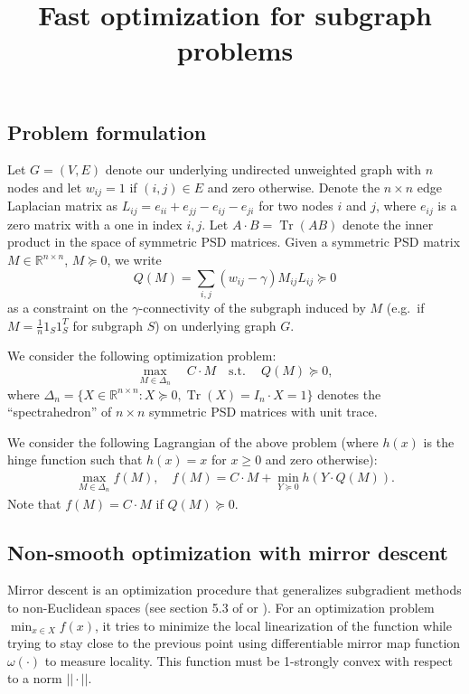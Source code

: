 \documentclass{article}
\DeclareMathOperator{\Tr}{Tr}
\begin{document}
\title{Fast optimization for subgraph problems}
\author{\vspace{-10pt}}

\maketitle

\subsection*{Problem formulation}

Let $G = (V,E)$ denote our underlying undirected unweighted graph with $n$ nodes and let $w_{ij} = 1$ if $(i,j) \in E$ and zero otherwise. Denote the $n \times n$ edge Laplacian matrix as $L_{ij} = e_{ii} + e_{jj} - e_{ij} - e_{ji}$ for two nodes $i$ and $j$, where $e_{ij}$ is a zero matrix with a one in index $i,j$. Let $A \cdot B = \Tr(A B)$ denote the inner product in the space of symmetric PSD matrices. Given a symmetric PSD matrix $M \in \mathbb{R}^{n \times n}$, $M \succeq 0$, we write
\[ Q(M) = \sum_{i,j} (w_{ij} - \gamma) M_{ij} L_{ij} \succeq 0 \]
as a constraint on the $\gamma$-connectivity of the subgraph induced by $M$ (e.g.\ if $M = \frac{1}{n} 1_S 1_S^T$ for subgraph $S$) on underlying graph $G$.

We consider the following optimization problem:
\begin{equation}\label{eq:opt}
  \max_{M \in \Delta_n} \quad C \cdot M \quad \mathrm{s.t.\ } \quad Q(M) \succeq 0,
\end{equation}
where $\Delta_n = \{X \in \mathbb{R}^{n \times n} : X \succeq 0, \Tr(X) = I_n \cdot X = 1 \}$ denotes the ``spectrahedron'' of $n \times n$ symmetric PSD matrices with unit trace. 

We consider the following Lagrangian of the above problem (where $h(x)$ is the hinge function such that $h(x) = x$ for $x \geq 0$ and zero otherwise):
\begin{align}\label{eq:opt2}
  \max_{M \in \Delta_n} f(M),\quad f(M) =  C \cdot M + \min_{Y \succeq 0}  h(Y \cdot Q(M)).
\end{align}
Note that $f(M) = C \cdot M$ if $Q(M) \succeq 0$.


\subsection*{Non-smooth optimization with mirror descent}

Mirror descent is an optimization procedure that generalizes subgradient methods to non-Euclidean spaces (see section 5.3 of \cite{lectures} or \cite{blog}). For an optimization problem $\min_{x \in X} f(x)$, it tries to minimize the local linearization of the function while trying to stay close to the previous point using  differentiable mirror map function $\omega(\cdot)$ to measure locality. This function must be 1-strongly convex with respect to a norm $||\cdot||$.
\end{document}
